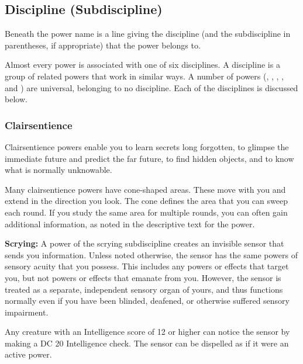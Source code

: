 \subsection{Discipline (Subdiscipline)}
Beneath the power name is a line giving the discipline (and the subdiscipline in parentheses, if appropriate) that the power belongs to.

Almost every power is associated with one of six disciplines. A discipline is a group of related powers that work in similar ways. A number of powers (, , , , and ) are universal, belonging to no discipline. Each of the disciplines is discussed below.

\subsubsection{Clairsentience}
Clairsentience powers enable you to learn secrets long forgotten, to glimpse the immediate future and predict the far future, to find hidden objects, and to know what is normally unknowable.


Many clairsentience powers have cone-shaped areas. These move with you and extend in the direction you look. The cone defines the area that you can sweep each round. If you study the same area for multiple rounds, you can often gain additional information, as noted in the descriptive text for the power.

\textbf{Scrying:} A power of the scrying subdiscipline creates an invisible sensor that sends you information. Unless noted otherwise, the sensor has the same powers of sensory acuity that you possess. This includes any powers or effects that target you, but not powers or effects that emanate from you. However, the sensor is treated as a separate, independent sensory organ of yours, and thus functions normally even if you have been blinded, deafened, or otherwise suffered sensory impairment.

Any creature with an Intelligence score of 12 or higher can notice the sensor by making a DC 20 Intelligence check. The sensor can be dispelled as if it were an active power.

